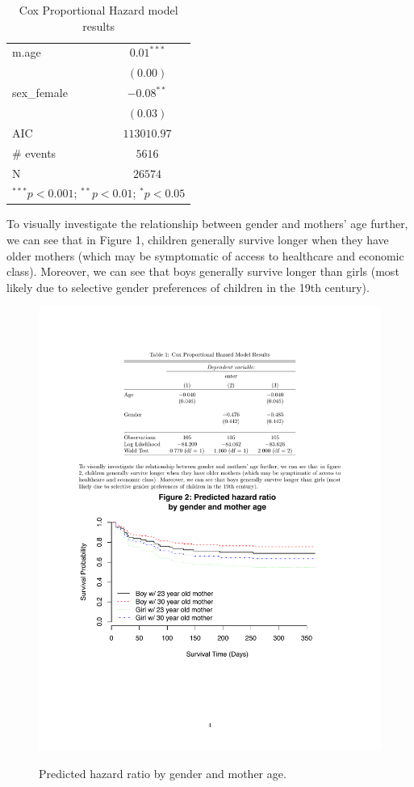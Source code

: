 \documentclass[12pt,letterpaper]{article}
\begin{document}
		\begin{table}[h!]
		\caption{\footnotesize Cox Proportional Hazard model results}
		\vspace{.25cm}
		\label{table:coefficients}
		\centering
		\begin{adjustbox}{width=.3\textwidth}
			\begin{tabular}{l c}
				\hline
			m.age       & $0.01^{***}$ \\
            & $(0.00)$     \\
sex\_female   & $-0.08^{**}$ \\
            & $(0.03)$     \\
\hline
AIC         & $113010.97$ \\
\# events & $5616$     \\
N   & $26574$    \\

				\hline
				\multicolumn{2}{l}{\footnotesize{$^{***}p<0.001$; $^{**}p<0.01$; $^{*}p<0.05$}}
			\end{tabular}
		\end{adjustbox}
	\end{table}
	
	To visually investigate the relationship between gender and mothers’ age further, we can see that in Figure 1, children generally survive longer when they have older mothers (which may be symptomatic of access to healthcare and economic class). Moreover, we can see that boys generally survive longer than girls (most likely due to selective gender preferences of children in the 19th century).
	
		
	\begin{figure}[h!]\centering
		\caption{\footnotesize Predicted hazard ratio by gender and mother age.}
		\label{fig:coxph}
				\vspace{.25cm}
		\includegraphics[width=.99\textwidth]{ps4_fig1.pdf}\\
	\end{figure}
\end{document}
